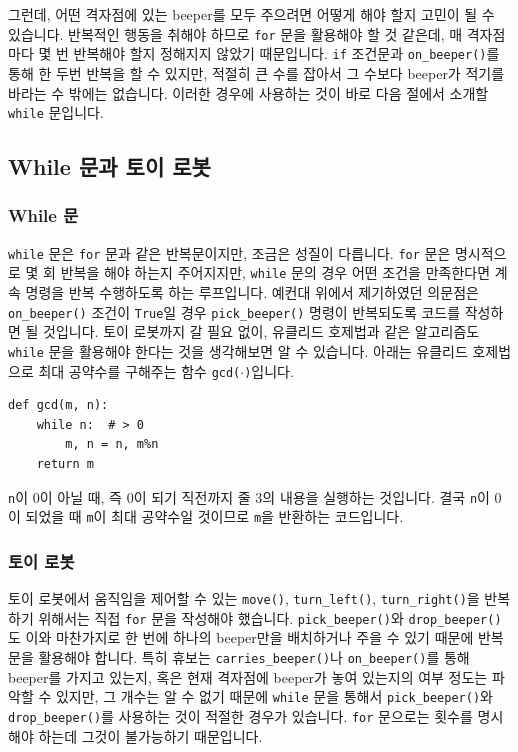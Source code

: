 \documentclass[../main.tex]{subfiles}
\begin{document}
그런데, 어떤 격자점에 있는 beeper를 모두 주으려면 어떻게 해야 할지 고민이 될 수 있습니다.
반복적인 행동을 취해야 하므로 \texttt{for} 문을 활용해야 할 것 같은데, 매 격자점마다 몇 번 반복해야 할지 정해지지 않았기 때문입니다.
\texttt{if} 조건문과 \texttt{on\_beeper()}를 통해 한 두번 반복을 할 수 있지만, 적절히 큰 수를 잡아서 그 수보다 beeper가 적기를 바라는 수 밖에는 없습니다.
이러한 경우에 사용하는 것이 바로 다음 절에서 소개할 \texttt{while} 문입니다.

\subsection{While 문과 토이 로봇}
\subsubsection{While 문}
\texttt{while} 문은 \texttt{for} 문과 같은 반복문이지만, 조금은 성질이 다릅니다.
\texttt{for} 문은 명시적으로 몇 회 반복을 해야 하는지 주어지지만, \texttt{while} 문의 경우 어떤 조건을 만족한다면 계속 명령을 반복 수행하도록 하는 루프입니다.
예컨대 위에서 제기하였던 의문점은 \texttt{on\_beeper()} 조건이 \texttt{True}일 경우 \texttt{pick\_beeper()} 명령이 반복되도록 코드를 작성하면 될 것입니다.
토이 로봇까지 갈 필요 없이, 유클리드 호제법과 같은 알고리즘도 \texttt{while} 문을 활용해야 한다는 것을 생각해보면 알 수 있습니다.
아래는 유클리드 호제법으로 최대 공약수를 구해주는 함수 \texttt{gcd($\cdot$)}입니다.
\begin{verbatim}
def gcd(m, n):
    while n:  # > 0
        m, n = n, m%n
    return m
\end{verbatim}
\texttt{n}이 0이 아닐 때, 즉 0이 되기 직전까지 줄 3의 내용을 실행하는 것입니다.
결국 \texttt{n}이 0이 되었을 때 \texttt{m}이 최대 공약수일 것이므로 \texttt{m}을 반환하는 코드입니다.

\subsubsection{토이 로봇}
토이 로봇에서 움직임을 제어할 수 있는 \texttt{move()}, \texttt{turn\_left()}, \texttt{turn\_right()}을 반복하기 위해서는 직접 \texttt{for} 문을 작성해야 했습니다.
\texttt{pick\_beeper()}와 \texttt{drop\_beeper()}도 이와 마찬가지로 한 번에 하나의 beeper만을 배치하거나 주을 수 있기 때문에 반복문을 활용해야 합니다.
특히 휴보는 \texttt{carries\_beeper()}나 \texttt{on\_beeper()}를 통해 beeper를 가지고 있는지, 혹은 현재 격자점에 beeper가 놓여 있는지의 여부 정도는 파악할 수 있지만, 그 개수는 알 수 없기 때문에 \texttt{while} 문을 통해서 \texttt{pick\_beeper()}와 \texttt{drop\_beeper()}를 사용하는 것이 적절한 경우가 있습니다.
\texttt{for} 문으로는 횟수를 명시해야 하는데 그것이 불가능하기 때문입니다.
\end{document}
